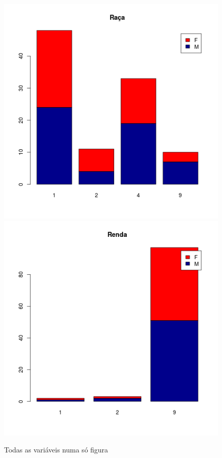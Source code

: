 \documentclass[a4paper]{article}
\begin{document}
\begin{figure}[!h]
  \includegraphics[width=.25\textwidth]{../figuras/raca-barplot}  \includegraphics[width=.25\textwidth]{../figuras/renda-barplot}
  \caption{Todas as variáveis numa só figura}
  \label{fig:escolaridade-barplot}
\end{figure}
\end{document}
